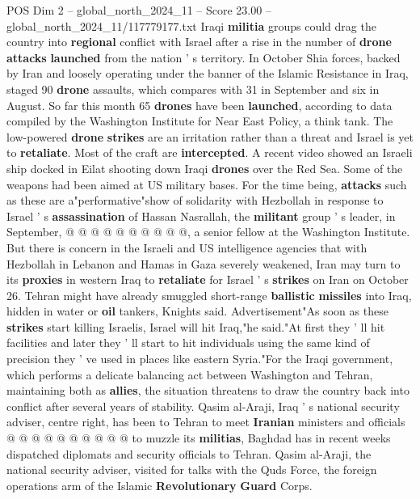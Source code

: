 \begin{textsample}{POS Dim 2 – global\_north\_2024\_11 – Score 23.00 – global\_north\_2024\_11/117779177.txt}  \label{ex:f2_pos_255}
Iraqi \textbf{militia} groups could drag the country into \textbf{regional} conflict with Israel after a rise in the number of \textbf{drone} \textbf{attacks} \textbf{launched} from the nation ' s territory.
In October Shia forces, backed by Iran and loosely operating under the banner of the Islamic Resistance in Iraq, staged 90 \textbf{drone} assaults, which compares with 31 in September and six in August.
So far this month 65 \textbf{drones} have been \textbf{launched}, according to data compiled by the Washington Institute for Near East Policy, a think tank.
The low-powered \textbf{drone} \textbf{strikes} are an irritation rather than a threat and Israel is yet to \textbf{retaliate}.
Most of the craft are \textbf{intercepted}.
A recent video showed an Israeli ship docked in Eilat shooting down Iraqi \textbf{drones} over the Red Sea.
Some of the weapons had been aimed at US military bases.
For the time being, \textbf{attacks} such as these are a"performative"show of solidarity with Hezbollah in response to Israel ' s \textbf{assassination} of Hassan Nasrallah, the \textbf{militant} group ' s leader, in September, @ @ @ @ @ @ @ @ @ @, a senior fellow at the Washington Institute.
But there is concern in the Israeli and US intelligence agencies that with Hezbollah in Lebanon and Hamas in Gaza severely weakened, Iran may turn to its \textbf{proxies} in western Iraq to \textbf{retaliate} for Israel ' s \textbf{strikes} on Iran on October 26.
Tehran might have already smuggled short-range \textbf{ballistic} \textbf{missiles} into Iraq, hidden in water or \textbf{oil} tankers, Knights said.
Advertisement"As soon as these \textbf{strikes} start killing Israelis, Israel will hit Iraq,"he said."At first they ' ll hit facilities and later they ' ll start to hit individuals using the same kind of precision they ' ve used in places like eastern Syria."For the Iraqi government, which performs a delicate balancing act between Washington and Tehran, maintaining both as \textbf{allies}, the situation threatens to draw the country back into conflict after several years of stability.
Qasim al-Araji, Iraq ' s national security adviser, centre right, has been to Tehran to meet \textbf{Iranian} ministers and officials @ @ @ @ @ @ @ @ @ @ to muzzle its \textbf{militias}, Baghdad has in recent weeks dispatched diplomats and security officials to Tehran.
Qasim al-Araji, the national security adviser, visited for talks with the Quds Force, the foreign operations arm of the Islamic \textbf{Revolutionary} \textbf{Guard} Corps.

\end{textsample}
